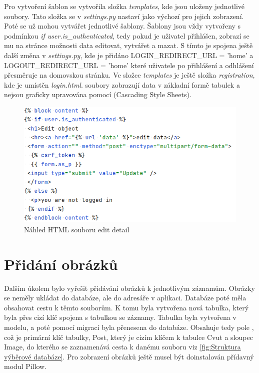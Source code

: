 Pro vytvoření  šablon se vytvořila složka \emph{templates}, kde
jsou uloženy jednotlivé  soubory. Tato složka se v \emph{settings.py}
nastaví jako výchozí pro jejich zobrazení. Poté se už mohou vytvářet
jednotlivé šablony. Šablony jsou vždy vytvořeny s podmínkou \emph{if
  user.is\_authenticated}, tedy pokud je uživatel přihlášen, zobrazí
se mu na stránce možnosti data editovat, vytvářet a mazat. S tímto je
spojena ještě další změna v \emph{settings.py}, kde je přidáno
LOGIN\_REDIRECT\_URL = 'home' a LOGOUT\_REDIRECT\_URL
  = 'home' které uživatele po přihlášení a odhlášení přesměruje na
domovskou stránku. Ve složce \emph{templates} je ještě složka
\emph{registration}, kde je umístěn \emph{login.html}.  soubory
zobrazují data v základní formě tabulek a nejsou graficky upravována
pomocí  (Cascading Style Sheets).

\begin{figure}[H] \centering
    \includegraphics[width=350pt]{./pictures/8-edit-detail-html.PNG}
    \caption[Náhled HTML souboru edit detail]{Náhled HTML souboru edit detail}
	\label{fig:Náhled HTML souboru edit detail}
\end{figure}


\newpage

\section{Přidání obrázků}
\label{Přidání obrázků}

Dalším úkolem bylo vyřešit přidávání obrázků k jednotlivým
záznamům. Obrázky se neměly ukládat do databáze, ale do adresáře v
aplikaci. Databáze poté měla obsahovat cestu k těmto souborům. K tomu
byla vytvořena nová tabulka, který byla přes cizí klíč spojena s
tabulkou se záznamy. Tabulka byla vytvořena v modelu, a poté pomocí
migrací byla přenesena do databáze. Obsahuje tedy pole , což je
primární klíč tabulky, Post, který je cizím klíčem k tabulce Cvut a
sloupec Image, do kterého se zaznamenává cesta k danému souboru viz \ref{fig:Struktura výběrové databáze}.
Pro zobrazení obrázků ještě musel být doinstalován přídavný modul Pillow.


